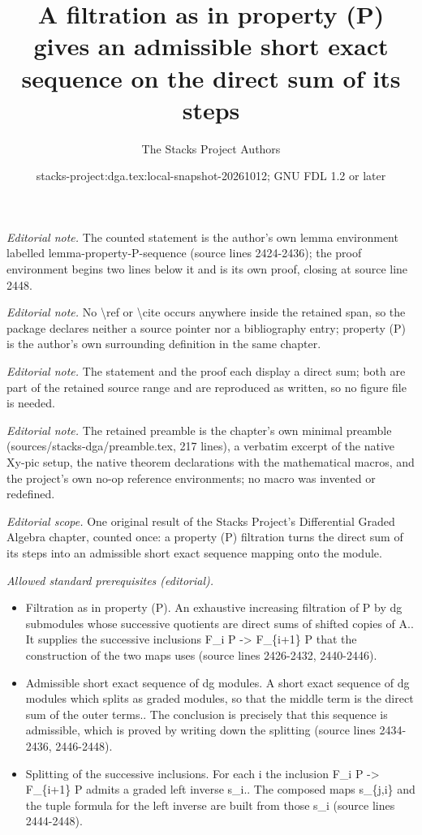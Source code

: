 \documentclass{stacks-project}
\title{A filtration as in property (P) gives an admissible short exact sequence on the direct sum of its steps}
\author{The Stacks Project Authors}
\date{stacks-project:dga.tex:local-snapshot-20261012; GNU FDL 1.2 or later}
\theoremstyle{plain}
\theoremstyle{definition}
\theoremstyle{remark}
\numberwithin{equation}{subsection}
\begin{document}
\maketitle
\noindent\textit{Editorial note.} The counted statement is the author's own lemma environment labelled lemma-property-P-sequence (source lines 2424-2436); the proof environment begins two lines below it and is its own proof, closing at source line 2448.\par\medskip
\noindent\textit{Editorial note.} No \textbackslash{}ref or \textbackslash{}cite occurs anywhere inside the retained span, so the package declares neither a source pointer nor a bibliography entry; property (P) is the author's own surrounding definition in the same chapter.\par\medskip
\noindent\textit{Editorial note.} The statement and the proof each display a direct sum; both are part of the retained source range and are reproduced as written, so no figure file is needed.\par\medskip
\noindent\textit{Editorial note.} The retained preamble is the chapter's own minimal preamble (sources/stacks-dga/preamble.tex, 217 lines), a verbatim excerpt of the native Xy-pic setup, the native theorem declarations with the mathematical macros, and the project's own no-op reference environments; no macro was invented or redefined.\par\medskip
\noindent\textit{Editorial scope.} One original result of the Stacks Project's Differential Graded Algebra chapter, counted once: a property (P) filtration turns the direct sum of its steps into an admissible short exact sequence mapping onto the module.\par\medskip
\noindent\textit{Allowed standard prerequisites (editorial).}\begin{itemize}
\item Filtration as in property (P). An exhaustive increasing filtration of P by dg submodules whose successive quotients are direct sums of shifted copies of A.. It supplies the successive inclusions F\_i P -> F\_\{i+1\} P that the construction of the two maps uses (source lines 2426-2432, 2440-2446).
\item Admissible short exact sequence of dg modules. A short exact sequence of dg modules which splits as graded modules, so that the middle term is the direct sum of the outer terms.. The conclusion is precisely that this sequence is admissible, which is proved by writing down the splitting (source lines 2434-2436, 2446-2448).
\item Splitting of the successive inclusions. For each i the inclusion F\_i P -> F\_\{i+1\} P admits a graded left inverse s\_i.. The composed maps s\_\{j,i\} and the tuple formula for the left inverse are built from those s\_i (source lines 2444-2448).
\end{itemize}\medskip
\end{document}
